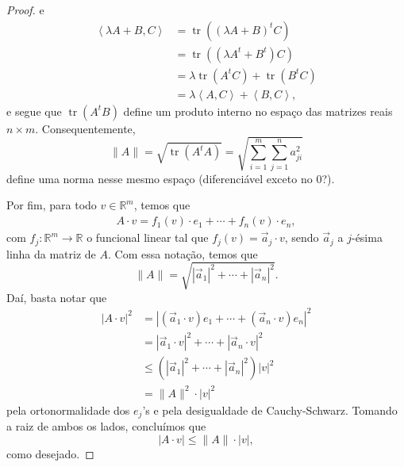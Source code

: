 \documentclass[12pt,a4paper]{article}
\DeclareMathOperator{\tr}{tr}
\newcommand{\R}{\mathbb{R}}
\begin{document}
\begin{proof}
        e
        \begin{align*}
            \left\langle \lambda A + B, C \right\rangle 
            &= \tr( (\lambda A + B)^tC ) \\
            &= \tr( (\lambda A^t + B^t)C ) \\
            &= \lambda\tr(A^tC) + \tr(B^tC) \\
            &= \lambda\left\langle A,C \right\rangle + \left\langle B,C \right\rangle,
        \end{align*}
        e segue que $\tr(A^tB)$ define um produto interno no espaço das matrizes reais $n\times m$.
        Consequentemente,
        \begin{equation*}
            \|A\| = \sqrt{\tr(A^tA)} = \sqrt{ \sum_{i=1}^{m}\sum_{j=1}^{n} a^2_{ji} }
        \end{equation*}
        define uma norma nesse mesmo espaço (diferenciável exceto no $0$?).
        
        Por fim, para todo $v\in\R^m$, temos que
        \begin{align*}
            A\cdot v = f_1(v)\cdot e_1 + \cdots + f_n(v)\cdot e_n,
        \end{align*}
        com $f_j:\R^m\to\R$ o funcional linear tal que $f_j(v) = \vec{a}_j\cdot v$, sendo
        $\vec{a}_j$ a $j$-ésima linha da matriz de $A$. Com essa notação, temos que
        \begin{equation*}
            \|A\| = \sqrt{ |\vec{a}_1|^2 + \cdots + |\vec{a}_n|^2 }.
        \end{equation*}
        Daí, basta notar que
        \begin{align*}
            |A\cdot v|^2 &= |(\vec{a}_1\cdot v)e_1 + \cdots + (\vec{a}_n\cdot v)e_n|^2 \\
                         &= |\vec{a}_1\cdot v|^2 + \cdots + |\vec{a}_n\cdot v|^2 \\
                         &\leq (|\vec{a}_1|^2 + \cdots + |\vec{a}_n|^2)|v|^2 \\
                         &= \|A\|^2 \cdot |v|^2
        \end{align*}
        pela ortonormalidade dos $e_j$'s e pela desigualdade de Cauchy-Schwarz. Tomando a raiz
        de ambos os lados, concluímos que
        \begin{equation*}
            |A\cdot v| \leq \|A\|\cdot |v|,
        \end{equation*}
        como desejado.
    \end{proof}
\end{document}
